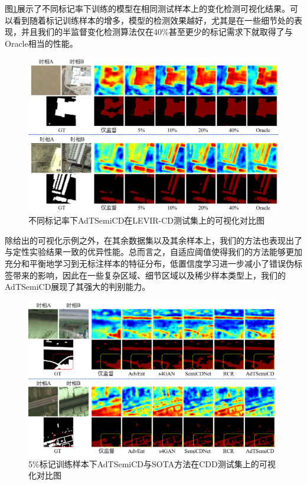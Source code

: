 \documentclass[lang=chs, degree=master, blindreview=false, adobe=false]{yanputhesis}
\begin{document}
图\ref{fig:AdTdiffLevir-vis}展示了不同标记率下训练的模型在相同测试样本上的变化检测可视化结果。可以看到随着标记训练样本的增多，模型的检测效果越好，尤其是在一些细节处的表现，并且我们的半监督变化检测算法仅在40$\%$甚至更少的标记需求下就取得了与Oracle相当的性能。
\begin{figure}[!htbp]
  \centering
  \includegraphics[scale=0.45]{images/AdTdiff_vis.png}
  \caption{
   不同标记率下AdTSemiCD在LEVIR-CD测试集上的可视化对比图
  }
  \label{fig:AdTdiffLevir-vis}
\end{figure}
除给出的可视化示例之外，在其余数据集以及其余样本上，我们的方法也表现出了与定性实验结果一致的优异性能。总而言之，自适应阈值使得我们的方法能够更加充分和平衡地学习到无标注样本的特征分布，低置信度学习进一步减小了错误伪标签带来的影响，因此在一些复杂区域、细节区域以及稀少样本类型上，我们的AdTSemiCD展现了其强大的判别能力。
\begin{figure}[!htbp]
  \centering
  \includegraphics[scale=0.45]{images/AdTcdd-vis.png}
  \caption{
    5$\%$标记训练样本下AdTSemiCD与SOTA方法在CDD测试集上的可视化对比图
  }
  \label{fig:AdTCdd-vis}
\end{figure}
\end{document}

